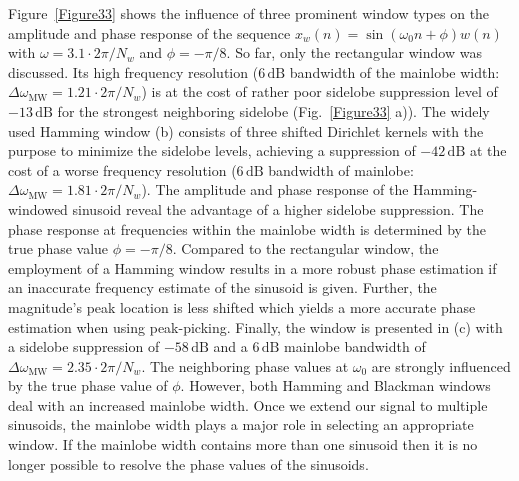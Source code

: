 \noindent Figure~\ref{Figure33} shows the influence of three prominent window types on the amplitude and phase response of the sequence $x_w(n)=\sin(\omega_0 n+\phi)w(n)$ with $\omega=3.1\cdot 2\pi/N_w$ and $\phi=-\pi/8$. So far, only the rectangular window was discussed. Its high frequency resolution ($6\,\text{dB}$ bandwidth of the mainlobe width: $\Delta\omega_{\text{MW}}=1.21\cdot 2\pi/N_w$) is at the cost of rather poor sidelobe suppression level of $-13\,\text{dB}$ for the strongest neighboring sidelobe (Fig.~\ref{Figure33} a)). The widely used Hamming window (b) consists of three shifted Dirichlet kernels with the purpose to minimize the sidelobe levels, achieving a suppression of $-42\,\text{dB}$ at the cost of a worse frequency resolution ($6\,\text{dB}$ bandwidth of mainlobe: $\Delta\omega_{\text{MW}}=1.81\cdot 2\pi/N_w$). The amplitude and phase response of the Hamming-windowed sinusoid reveal the advantage of a higher sidelobe suppression. The phase response at frequencies within the mainlobe width
is determined by the true phase value $\phi=-\pi/8$.
Compared to the rectangular window, the employment of a Hamming window results in a more robust phase estimation if an inaccurate frequency estimate of the sinusoid is given. Further, the magnitude's peak location is less shifted which yields a more accurate phase estimation when using peak-picking. Finally, the  window is presented in (c) with a sidelobe suppression of $-58\,\text{dB}$ and a $6\,\text{dB}$ mainlobe bandwidth of $\Delta\omega_{\text{MW}}=2.35\cdot 2\pi/N_w$. The neighboring phase values at $\omega_0$ are strongly influenced by the true phase value of $\phi$. However, both Hamming and Blackman windows deal with an increased mainlobe width. Once we extend our signal to multiple sinusoids, the mainlobe width plays a major role in selecting an appropriate window. If the mainlobe width contains more than one sinusoid then it is no longer possible to resolve the phase values of the sinusoids.

